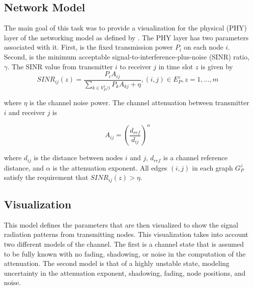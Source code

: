 \subsection{Network Model}
The main goal of this task was to provide a visualization for the physical (PHY) layer of the networking model as defined by \cite{WuChoQia05}.  The PHY layer has two parameters associated with it.  First, is the fixed transmission power $P_i$ on each node $i$.  Second, is the minimum acceptable signal-to-interference-plus-noise (SINR) ratio, $\gamma$.  The SINR value from transmitter $i$ to receiver $j$ in time slot $z$ is given by
\begin{equation}
SINR_{ij}(z) = \frac{P_i A_{ij}}{\sum_{k \in V_P^z / i} P_k A_{k j} + \eta } , (i, j) \in E_P^z , z = 1,...,m
\end{equation} 

where $\eta$ is the channel noise power.  The channel attenuation between transmitter $i$ and receiver $j$ is 

\begin{equation}
A_{ij} = (\frac{d_{ref}}{d_{ij}})^\alpha
\end{equation}

where $d_{ij}$ is the distance between nodes $i$ and $j$, $d_{ref}$ is a channel reference distance, and $\alpha$ is the attenuation exponent.  All edges $(i,j)$ in each graph $G_P^z$ satisfy the requirement that \begin{math}SINR_{ij}(z) > \eta \end{math}.

\subsection{Visualization}
This model defines the parameters that are then visualized to show the signal radiation patterns from transmitting nodes.  This visualization takes into account two different models of the channel.  The first is a channel state that is assumed to be fully known with no fading, shadowing, or noise in the computation of the attenuation.  The second model is that of a highly unstable state, modeling uncertainty in the attenuation exponent, shadowing, fading, node positions, and noise.

